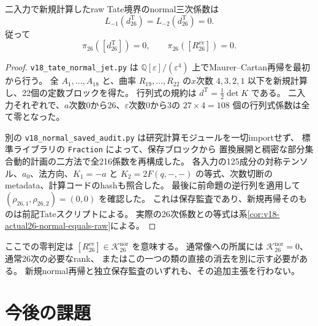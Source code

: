 \begin{proposition}
\label{prop:v18-normal26-tate-zero}
二入力で新規計算したraw Tate境界のnormal三次係数は
\[
 L_{-1}(d_{26}^{\mathrm T})=L_{-2}(d_{26}^{\mathrm T})=0.
\]
従って
\[
 \pi_{26}([d_{26}^{\mathrm T}])=0,\qquad
 \pi_{26}([R_{26}^{\mathrm{ev}}])=0.
\]
\end{proposition}
\begin{proof}
\texttt{v18\_tate\_normal\_jet.py} は
$\mathbb Q[\varepsilon]/(\varepsilon^4)$ 上でMaurer--Cartan再帰を最初から行う。
全 $A_1,\ldots,A_{18}$ と、曲率 $R_{19},\ldots,R_{22}$ の$x$次数
$4,3,2,1$ 以下を新規計算し、22個の定数ブロックを得た。
行列式の規約は $d^{\mathrm T}=\tfrac12\det K$ である。
二入力それぞれで、$a$次数0から26、$\varepsilon$次数0から3の
$27\times4=108$ 個の行列式係数は全て零となった。

別の \texttt{v18\_normal\_saved\_audit.py} は研究計算モジュールを一切importせず、
標準ライブラリの \texttt{Fraction} によって、保存ブロックから
置換展開と稠密な部分集合動的計画の二方法で全216係数を再構成した。
各入力の125成分の対称テンソル、$a_0$、法方向、$K_1=-a$ と
$K_2=2F(q,-,-)$ の等式、次数切断のmetadata、計算コードのhashも照合した。
最後に前命題の逆行列を適用して $(\rho_{26,1},\rho_{26,2})=(0,0)$ を確認した。
これは保存監査であり、新規再帰そのものは前記Tateスクリプトによる。
実際の26次係数との等式は系\ref{cor:v18-actual26-normal-equals-raw}による。
\end{proof}

\begin{remark}[結論の範囲]
ここでの零判定は $[R_{26}^{\mathrm{ev}}]\in\mathcal K_{26}^{\mathrm{nor}}$ を意味する。
通常像への所属には $\mathcal K_{26}^{\mathrm{nor}}=0$、通常26次の必要なrank、
またはこの一つの類の直接の消去を別に示す必要がある。
新規normal再帰と独立保存監査のいずれも、その追加主張を行わない。
\end{remark}


\clearpage
\section{今後の課題}

